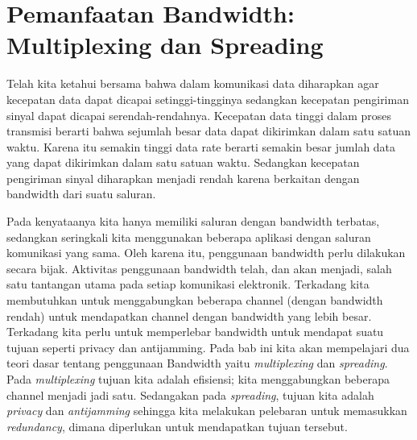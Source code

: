 \chapter{Pemanfaatan Bandwidth: Multiplexing dan Spreading}

Telah kita ketahui bersama bahwa dalam komunikasi data diharapkan agar kecepatan data dapat dicapai setinggi-tingginya sedangkan kecepatan pengiriman sinyal dapat dicapai serendah-rendahnya. Kecepatan data tinggi dalam proses transmisi berarti bahwa sejumlah besar data dapat dikirimkan dalam satu satuan waktu. Karena itu semakin tinggi data rate berarti semakin besar jumlah data yang dapat dikirimkan dalam satu satuan waktu. Sedangkan kecepatan pengiriman sinyal diharapkan menjadi rendah karena berkaitan dengan bandwidth dari suatu saluran.

Pada kenyataanya kita hanya memiliki saluran dengan bandwidth terbatas, sedangkan seringkali kita menggunakan beberapa aplikasi dengan saluran komunikasi yang sama. Oleh karena itu, penggunaan bandwidth perlu dilakukan secara bijak. Aktivitas penggunaan bandwidth telah, dan akan menjadi, salah satu tantangan utama pada setiap komunikasi elektronik. Terkadang kita membutuhkan untuk menggabungkan beberapa channel (dengan bandwidth rendah) untuk mendapatkan channel dengan bandwidth yang lebih besar. Terkadang kita perlu untuk memperlebar bandwidth untuk mendapat suatu tujuan seperti privacy dan antijamming. Pada bab ini kita akan mempelajari dua teori dasar tentang penggunaan Bandwidth yaitu \textit{multiplexing} dan \textit{spreading}. Pada \textit{multiplexing} tujuan kita adalah efisiensi; kita menggabungkan beberapa channel menjadi jadi satu. Sedangakan pada \textit{spreading}, tujuan kita adalah \textit{privacy} dan \textit{antijamming} sehingga kita melakukan pelebaran untuk memasukkan \textit{redundancy}, dimana diperlukan untuk mendapatkan tujuan tersebut. 


